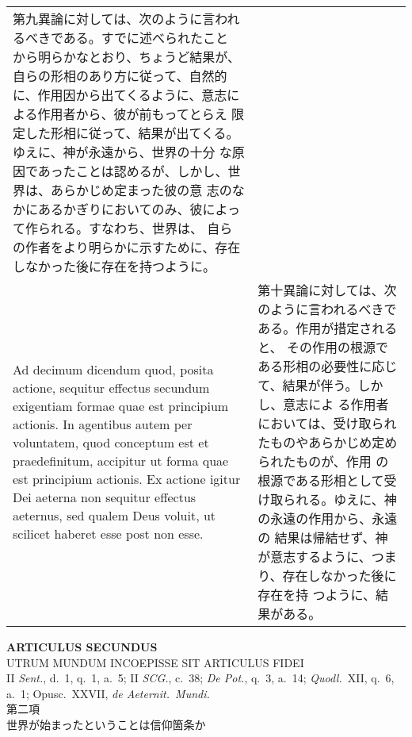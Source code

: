 \documentclass[10pt]{jsarticle} %
\begin{document}
\begin{longtable}{p{21em}p{21em}}
第九異論に対しては、次のように言われるべきである。すでに述べられたこと
から明らかなとおり、ちょうど結果が、自らの形相のあり方に従って、自然的
に、作用因から出てくるように、意志による作用者から、彼が前もってとらえ
限定した形相に従って、結果が出てくる。ゆえに、神が永遠から、世界の十分
な原因であったことは認めるが、しかし、世界は、あらかじめ定まった彼の意
志のなかにあるかぎりにおいてのみ、彼によって作られる。すなわち、世界は、
自らの作者をより明らかに示すために、存在しなかった後に存在を持つように。


\\


{\sc Ad decimum dicendum} quod, posita actione, sequitur effectus secundum
 exigentiam formae quae est principium actionis. In agentibus autem per
 voluntatem, quod conceptum est et praedefinitum, accipitur ut forma
 quae est principium actionis. Ex actione igitur Dei aeterna non
 sequitur effectus aeternus, sed qualem Deus voluit, ut scilicet haberet
 esse post non esse.

&

第十異論に対しては、次のように言われるべきである。作用が措定されると、
その作用の根源である形相の必要性に応じて、結果が伴う。しかし、意志によ
る作用者においては、受け取られたものやあらかじめ定められたものが、作用
の根源である形相として受け取られる。ゆえに、神の永遠の作用から、永遠の
結果は帰結せず、神が意志するように、つまり、存在しなかった後に存在を持
つように、結果がある。


\\


\end{longtable}
\newpage
{}
\begin{center}
 {\Large {\bfseries ARTICULUS SECUNDUS}}\\
{\large UTRUM MUNDUM INCOEPISSE SIT ARTICULUS FIDEI}\\
{\footnotesize II {\itshape Sent.}, d.~1, q.~1, a.~5; II {\itshape
 SCG.}, c.~38; {\itshape De Pot.}, q.~3, a.~14; {\itshape Quodl.}~XII,
 q.~6, a.~1; Opusc.}~XXVII, {\itshape de Aeternit.~Mundi.}\\
{\Large 第二項\\世界が始まったということは信仰箇条か}
\end{center}
\end{document}
